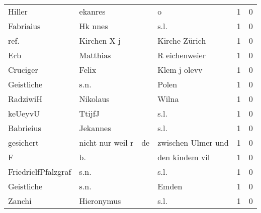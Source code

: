 \begin{center}
\begin{tiny}
\begin{longtabu}{llllrr}
                   Hiller &                            ekanres &             &                                           o &          1 &         0 \\
                Fabriaius &                            Hk nnes &             &                                        s.l. &          1 &         0 \\
                     ref. &                        Kirchen X j &             &                               Kirche Zürich &          1 &         0 \\
                      Erb &                           Matthias &             &                               R eichenweier &          1 &         0 \\
                 Cruciger &                              Felix &             &                                Klem j olevv &          1 &         0 \\
               Geistliche &                               s.n. &             &                                       Polen &          1 &         0 \\
                 RadziwiH &                           Nikolaus &             &                                       Wilna &          1 &         0 \\
                  keUeyvU &                             TtijfJ &             &                                        s.l. &          1 &         0 \\
                Babrieius &                           Jekannes &             &                                        s.l. &          1 &         0 \\
                gesichert &                   nicht nur weil r &          de &                          zwischen Ulmer und &          1 &         0 \\
                        F &                                 b. &             &                              den kindem vil &          1 &         0 \\
      FriedriclfPfalzgraf &                               s.n. &             &                                        s.l. &          1 &         0 \\
               Geistliche &                               s.n. &             &                                       Emden &          1 &         0 \\
                   Zanchi &                         Hieronymus &             &                                        s.l. &          1 &         0 \\

\end{longtabu}
\end{tiny}
\end{center}
